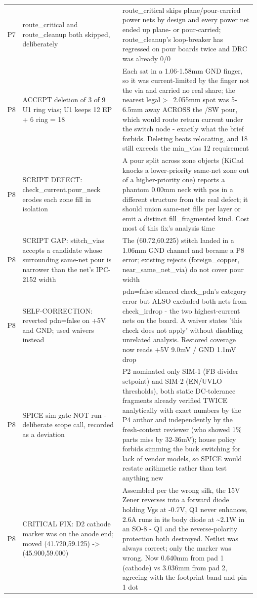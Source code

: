 \documentclass[11pt,a4paper]{article}
\begin{document}
{\begin{longtable}{lp{5.2cm}p{7.2cm}}
P7 & route\_critical and route\_cleanup both skipped, deliberately & route\_critical skips plane/pour-carried power nets by design and every power net ended up plane- or pour-carried; route\_cleanup's loop-breaker has regressed on pour boards twice and DRC was already 0/0 \\
P8 & ACCEPT deletion of 3 of 9 U1 ring vias; U1 keeps 12 EP + 6 ring = 18 & Each sat in a 1.06-1.58mm GND finger, so it was current-limited by the finger not the via and carried no real share; the nearest legal \textgreater{}=2.055mm spot was 5-6.5mm away ACROSS the /SW pour, which would route return current under the switch node - exactly what the brief forbids. Deleting beats relocating, and 18 still exceeds the min\_vias 12 requirement \\
P8 & SCRIPT DEFECT: check\_current.pour\_neck erodes each zone fill in isolation & A pour split across zone objects (KiCad knocks a lower-priority same-net zone out of a higher-priority one) reports a phantom 0.00mm neck with pos in a different structure from the real defect; it should union same-net fills per layer or emit a distinct fill\_fragmented kind. Cost most of this fix's analysis time \\
P8 & SCRIPT GAP: stitch\_vias accepts a candidate whose surrounding same-net pour is narrower than the net's IPC-2152 width & The (60.72,60.225) stitch landed in a 1.06mm GND channel and became a P8 error; existing rejects (foreign\_copper, near\_same\_net\_via) do not cover pour width \\
P8 & SELF-CORRECTION: reverted pdn=false on +5V and GND; used waivers instead & pdn=false silenced check\_pdn's category error but ALSO excluded both nets from check\_irdrop - the two highest-current nets on the board. A waiver states 'this check does not apply' without disabling unrelated analysis. Restored coverage now reads +5V 9.0mV / GND 1.1mV drop \\
P8 & SPICE sim gate NOT run - deliberate scope call, recorded as a deviation & P2 nominated only SIM-1 (FB divider setpoint) and SIM-2 (EN/UVLO thresholds), both static DC-tolerance fragments already verified TWICE analytically with exact numbers by the P4 author and independently by the fresh-context reviewer (who showed 1\% parts miss by 32-36mV); house policy forbids simming the buck switching for lack of vendor models, so SPICE would restate arithmetic rather than test anything new \\
P8 & CRITICAL FIX: D2 cathode marker was on the anode end; moved (41.720,59.125) -\textgreater{} (45.900,59.000) & Assembled per the wrong silk, the 15V Zener reverses into a forward diode holding Vgs at -0.7V, Q1 never enhances, 2.6A runs in its body diode at \textasciitilde{}2.1W in an SO-8 - Q1 and the reverse-polarity protection both destroyed. Netlist was always correct; only the marker was wrong. Now 0.640mm from pad 1 (cathode) vs 3.036mm from pad 2, agreeing with the footprint band and pin-1 dot \\

\end{longtable}}
\end{document}
